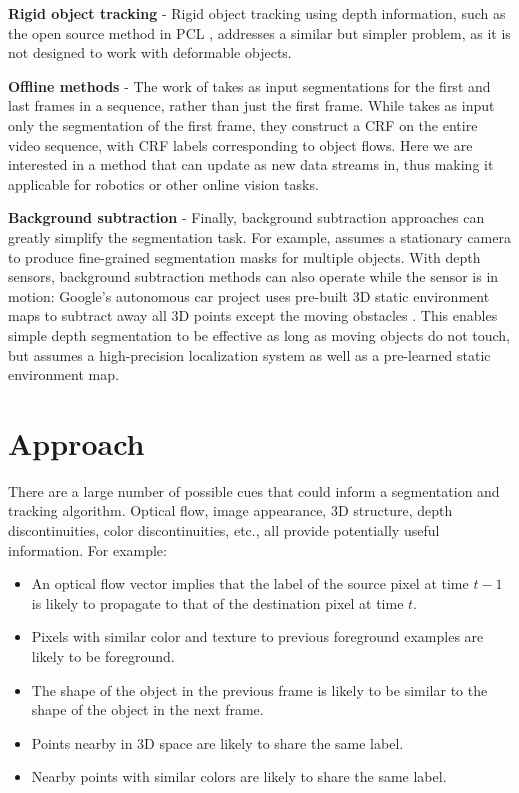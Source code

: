 \documentclass[graybox]{svmult}
\begin{document}
\textbf{Rigid object tracking} - Rigid object tracking using depth information, such as the open source method in PCL \cite{rusu2011a}, addresses a similar but simpler problem, as it is not designed to work with deformable objects.

\textbf{Offline methods} - The work of \cite{budvytis2011a} takes as input segmentations for the first and last frames in a sequence, rather than just the first frame.  While \cite{tsai2010a} takes as input only the segmentation of the first frame, they construct a CRF on the entire video sequence, with CRF labels corresponding to object flows.  Here we are interested in a method that can update as new data streams in, thus making it applicable for robotics or other online vision tasks.

\textbf{Background subtraction} - Finally, background subtraction approaches can greatly simplify the segmentation task.  For example, \cite{aeschliman2010a} assumes a stationary camera to produce fine-grained segmentation masks for multiple objects.  With depth sensors, background subtraction methods can also operate while the sensor is in motion: Google's autonomous car project uses pre-built 3D static environment maps to subtract away all 3D points except the moving obstacles \cite{urmson2011a}.  This enables simple depth segmentation to be effective as long as moving objects do not touch, but assumes a high-precision localization system as well as a pre-learned static environment map.

\section{Approach}

There are a large number of possible cues that could inform a segmentation and tracking algorithm.  Optical flow, image appearance, 3D structure, depth discontinuities, color discontinuities, etc., all provide potentially useful information.  For example:
\begin{itemize}
  \item An optical flow vector implies that the label of the source pixel at time $t-1$ is likely to propagate to that of the destination pixel at time $t$.
\item Pixels with similar color and texture to previous foreground examples are likely to be foreground.
\item The shape of the object in the previous frame is likely to be similar to the shape of the object in the next frame.
\item Points nearby in 3D space are likely to share the same label.
\item Nearby points with similar colors are likely to share the same label.
\end{itemize}
\end{document}
